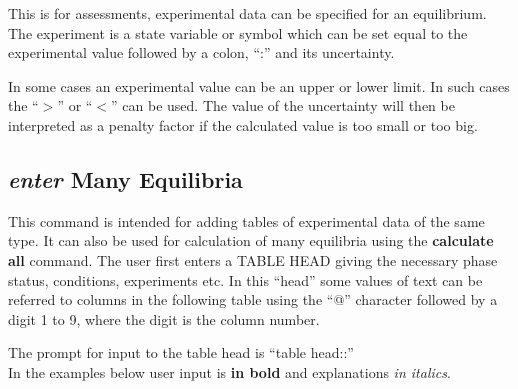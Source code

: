 \documentclass[12pt]{article}
\begin{document}
This is for assessments, experimental data can be specified for an
equilibrium.  The experiment is a state variable or symbol which can
be set equal to the experimental value followed by a colon, ``:'' and
its uncertainty.  

In some cases an experimental value can be an upper or lower limit.
In such cases the ``$>$'' or ``$<$'' can be used.  The value of the
uncertainty will then be interpreted as a penalty factor if the
calculated value is too small or too big.

\subsection{{\em enter} Many Equilibria}

This command is intended for adding tables of experimental data of the
same type.  It can also be used for calculation of many equilibria
using the {\bf calculate all} command.  The user first enters a TABLE
HEAD giving the necessary phase status, conditions, experiments etc.
In this ``head'' some values of text can be referred to columns in the
following table using the ``@'' character followed by a digit 1 to 9,
where the digit is the column number.

The prompt for input to the table head is ``table head::''\\ In the
examples below user input is {\bf in bold} and explanations {\em in
  italics}.
\end{document}
